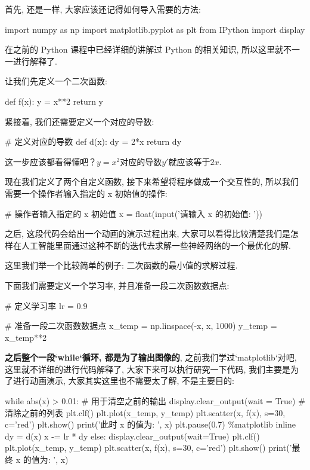 首先, 还是一样, 大家应该还记得如何导入需要的方法: 

\begin{python}
import numpy as np
import matplotlib.pyplot as plt
from IPython import display
\end{python}

在之前的 Python 课程中已经详细的讲解过 Python 的相关知识, 所以这里就不一一进行解释了. 

让我们先定义一个二次函数: 

\begin{python}
def f(x):
    y = x**2
    return y
\end{python}

紧接着, 我们还需要定义一个对应的导数: 

\begin{python}
# 定义对应的导数
def d(x):
    dy = 2*x
    return dy
\end{python}

这一步应该都看得懂吧？$y=x^2$对应的导数$y'$就应该等于$2x$. 

现在我们定义了两个自定义函数, 接下来希望将程序做成一个交互性的, 所以我们需要一个操作者输入指定的 x 初始值的操作: 

\begin{python}
# 操作者输入指定的 x 初始值
x = float(input('请输入 x 的初始值: '))
\end{python}

之后, 这段代码会给出一个动画的演示过程出来, 大家可以看得比较清楚我们是怎样在人工智能里面通过这种不断的迭代去求解一些神经网络的一个最优化的解. 

这里我们举一个比较简单的例子: 二次函数的最小值的求解过程. 

下面我们需要定义一个学习率, 并且准备一段二次函数数据点: 

\begin{python}
# 定义学习率
lr = 0.9

# 准备一段二次函数数据点
x_temp = np.linspace(-x, x, 1000)
y_temp = x_temp**2
\end{python}

\textbf{之后整个一段`while`循环, 都是为了输出图像的}, 之前我们学过`matplotlib`对吧, 这里就不详细的进行代码解释了, 大家下来可以执行研究一下代码, 我们主要是为了进行动画演示, 大家其实这里也不需要太了解, 不是主要目的: 

\begin{python}
while abs(x) > 0.01:
    # 用于清空之前的输出
    display.clear_output(wait = True) 
    # 清除之前的列表
    plt.clf()
    plt.plot(x_temp, y_temp)
    plt.scatter(x, f(x), s=30, c='red')
    plt.show()
    print('此时 x 的值为: ', x)
    plt.pause(0.7)
    \%matplotlib inline
    dy = d(x)
    x -= lr * dy
else:
    display.clear_output(wait=True)
    plt.clf()
    plt.plot(x_temp, y_temp)
    plt.scatter(x, f(x), s=30, c='red')
    plt.show()
    print('最终 x 的值为: ', x)
\end{python}


